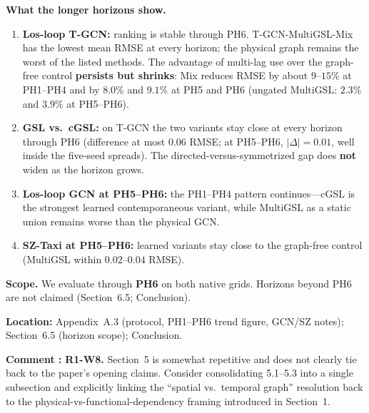 \documentclass[a4paper,11pt]{article}
\newcounter{commentcounter}
\newcommand{\reviewercomment}[1]{%
    \stepcounter{commentcounter}%
    \begin{reviewerscomment}
        \textbf{Comment \arabic{commentcounter}:} #1
    \end{reviewerscomment}
}
\begin{document}
{\textbf{What the longer horizons show.}
\begin{enumerate}
    \item \textbf{Los-loop T-GCN:} ranking is stable through PH6. T-GCN-MultiGSL-Mix has the lowest mean RMSE at every horizon; the physical graph remains the worst of the listed methods. The advantage of multi-lag use over the graph-free control \textbf{persists but shrinks}: Mix reduces RMSE by about $9$--$15\%$ at PH1--PH4 and by $8.0\%$ and $9.1\%$ at PH5 and PH6 (ungated MultiGSL: $2.3\%$ and $3.9\%$ at PH5--PH6).
    \item \textbf{GSL vs.\ cGSL:} on T-GCN the two variants stay close at every horizon through PH6 (difference at most $0.06$ RMSE; at PH5--PH6, $|{\Delta}|=0.01$, well inside the five-seed spreads). The directed-versus-symmetrized gap does \textbf{not} widen as the horizon grows.
    \item \textbf{Los-loop GCN at PH5--PH6:} the PH1--PH4 pattern continues---cGSL is the strongest learned contemporaneous variant, while MultiGSL as a static union remains worse than the physical GCN.
    \item \textbf{SZ-Taxi at PH5--PH6:} learned variants stay close to the graph-free control (MultiGSL within $0.02$--$0.04$ RMSE).
\end{enumerate}

\textbf{Scope.} We evaluate through \textbf{PH6} on both native grids. Horizons beyond PH6 are not claimed (Section~6.5; Conclusion). 

\textbf{Location:} Appendix~A.3 (protocol, PH1--PH6 trend figure, GCN/SZ notes); Section~6.5 (horizon scope); Conclusion.
}

\reviewercomment{
\textbf{R1-W8.} Section~5 is somewhat repetitive and does not clearly tie back to the paper's opening claims. Consider consolidating 5.1--5.3 into a single subsection and explicitly linking the ``spatial vs.\ temporal graph'' resolution back to the physical-vs-functional-dependency framing introduced in Section~1.
}
\end{document}
